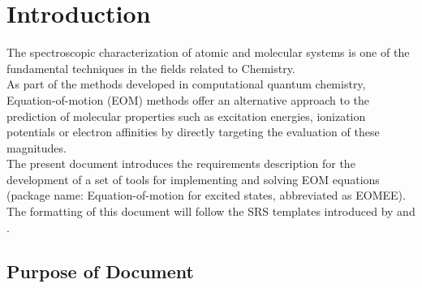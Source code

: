 \documentclass[12pt]{article}
\begin{document}

\section{Introduction}


The spectroscopic characterization of atomic and molecular systems is one 
of the fundamental techniques in the fields related to Chemistry. \\
As part of 
the methods developed in computational quantum chemistry, Equation-of-motion 
(EOM) methods offer an alternative approach to the prediction of molecular 
properties such as excitation energies, ionization potentials or electron 
affinities by directly targeting the evaluation of these magnitudes.\\ 
The present document introduces the requirements description for the 
development of a set of tools for implementing and solving EOM 
equations (package name: Equation-of-motion for excited states, abbreviated as 
EOMEE). The formatting of this document will follow the SRS templates 
introduced 
by 
\cite{Smith2016} and \cite{SmithEtAl2007}.


\subsection{Purpose of Document}
\end{document}
